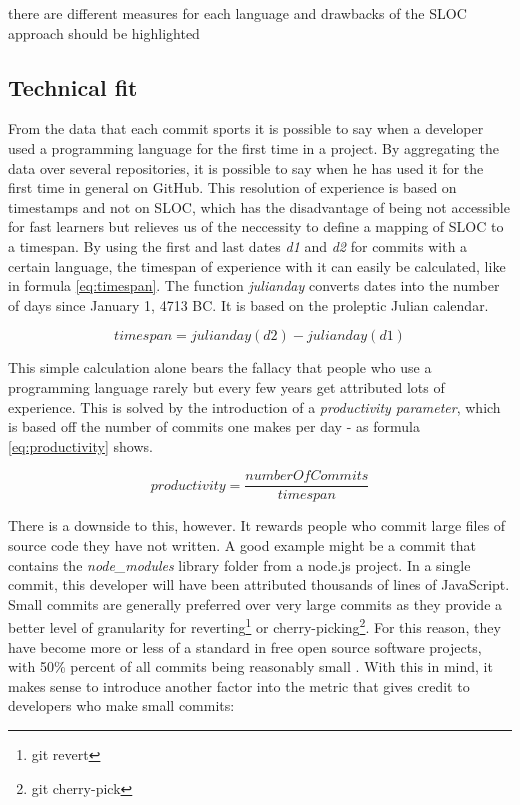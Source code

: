 there are different measures for each language and drawbacks of the SLOC approach
should be highlighted

\subsection{Technical fit}
From the data that each commit sports it is possible to say when a developer
used a programming language for the first time in a project.
By aggregating the data over several repositories, it is possible to say when
he has used it for the first time in general on GitHub.
This resolution of experience is based on timestamps and not on SLOC,
which has the disadvantage of being not accessible for fast learners
but relieves us of the neccessity to define a mapping of SLOC to a timespan.
By using the first and last dates \textit{d1} and \textit{d2} for commits
with a certain language, the timespan of experience with it can easily be
calculated, like in formula \ref{eq:timespan}. The function \textit{
julianday} converts dates into the number of days since January 1, 4713 BC.
It is based on the proleptic Julian calendar.

\begin{equation}
timespan = julianday(d2) - julianday(d1)
\label{eq:timespan}
\end{equation}

This simple calculation alone bears the fallacy that people who use a
programming language rarely but every few years get attributed lots
of experience. This is solved by the introduction of a \textit{productivity parameter},
which is based off the number of commits one makes per day - as formula \ref{eq:productivity} shows.

\begin{equation}
productivity = \frac{numberOfCommits}{timespan}
\label{eq:productivity}
\end{equation}

There is a downside to this, however. It rewards people who commit
large files of source code they have not written. A good example might be
a commit that contains the \textit{node\_modules} library folder from a
node.js project. In a single commit, this developer will have been
attributed thousands of lines of JavaScript. Small commits are generally
preferred \cite{so:commitsize}
over very large commits as they provide a better level of granularity for
reverting\footnote{git revert} or cherry-picking\footnote{git cherry-pick}.
For this reason, they have become more or less of a standard in
free open source software projects, with 50\% percent of all commits
being reasonably small \cite{rsk:2014}.
With this in mind, it makes sense to introduce another factor into
the metric that gives credit to developers who make small commits:

